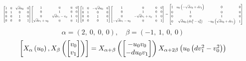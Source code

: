 \documentclass[11pt]{article}
\theoremstyle{definition}
\begin{document}
\[
\scaletoalign{\textwidth}{{\left[\begin{matrix}1 & 0 & \sqrt{d} u_{0} & 0\\0 & 1 & 0 & 0\\0 & 0 & 1 & 0\\0 & 0 & 0 & 1\end{matrix}\right]} {\left[\begin{matrix}1 & 0 & 0 & 0\\0 & 1 & 0 & 0\\0 & \sqrt{d} v_{1} - v_{0} & 1 & 0\\\sqrt{d} v_{1} + v_{0} & 0 & 0 & 1\end{matrix}\right]} {\left[\begin{matrix}1 & 0 & - \sqrt{d} u_{0} & 0\\0 & 1 & 0 & 0\\0 & 0 & 1 & 0\\0 & 0 & 0 & 1\end{matrix}\right]} {\left[\begin{matrix}1 & 0 & 0 & 0\\0 & 1 & 0 & 0\\0 & - \sqrt{d} v_{1} + v_{0} & 1 & 0\\- \sqrt{d} v_{1} - v_{0} & 0 & 0 & 1\end{matrix}\right]} = {\left[\begin{matrix}1 & u_{0} \left(- \sqrt{d} v_{0} + d v_{1}\right) & 0 & 0\\0 & 1 & 0 & 0\\0 & 0 & 1 & 0\\0 & \sqrt{d} u_{0} \left(d v_{1}^{2} - v_{0}^{2}\right) & - u_{0} \left(\sqrt{d} v_{0} + d v_{1}\right) & 1\end{matrix}\right]}}
\]
\[
\alpha = \left( 2, \  0, \  0, \  0\right), \quad \beta = \left( -1, \  1, \  0, \  0\right)
\]
\[
\scaletoalign{\textwidth}{\left[ X_{\alpha}\left(u_{0}\right), X_{\beta}\left(\left[\begin{matrix}v_{0}\\v_{1}\end{matrix}\right]\right) \right] = X_{\alpha + \beta}\left(\left[\begin{matrix}- u_{0} v_{0}\\- d u_{0} v_{1}\end{matrix}\right]\right) X_{\alpha + 2\beta}\left(u_{0} \left(d v_{1}^{2} - v_{0}^{2}\right)\right)}
\]
\end{document}
